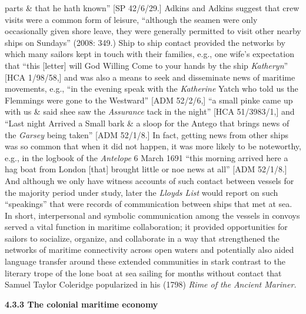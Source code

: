 \begin{styleStandard}
parts \& that he hath known” [SP 42/6/29.] Adkins and Adkins suggest that crew visits were a common form of leisure, “although the seamen were only occasionally given shore leave, they were generally permitted to visit other nearby ships on Sundays” (2008: 349.) Ship to ship contact provided the networks by which many sailors kept in touch with their families, e.g., one wife’s expectation that “this [letter] will God Willing Come to your hands by the ship\textit{ Katheryn}” [HCA 1/98/58,] and was also a means to seek and disseminate news of maritime movements, e.g., “in the evening speak with the \textit{Katherine }Yatch who told us the Flemmings were gone to the Westward” [ADM 52/2/6,] “a small pinke came up with us \& said shee saw the \textit{Assurance} tack in the night” [HCA 51/3983/1,] and “Last night Arrived a Small bark \& a sloop for the Antego that brings news of the \textit{Garsey }being taken” [ADM 52/1/8.] In fact, getting news from other ships was so common that when it did\textit{ }not happen, it was more likely to be noteworthy, e.g., in the logbook of the\textit{ Antelope} 6 March 1691 “this morning arrived here a hag boat from London [that] brought little or noe news at all” [ADM 52/1/8.] And although we only have witness accounts of such contact between vessels for the majority period under study, later the \textit{Lloyd{\textquotesingle}s List} would report on such “speakings” that were records of communication between ships that met at sea. In short, interpersonal and symbolic communication among the vessels in convoys served a vital function in maritime collaboration; it provided opportunities for sailors to socialize, organize, and collaborate in a way that strengthened the networks of maritime connectivity across open waters and potentially also aided language transfer around these extended communities in stark contrast to the literary trope of the lone boat at sea sailing for months without contact that Samuel Taylor Coleridge popularized in his (1798) \textit{Rime of the }\textit{\MakeUppercase{A}}\textit{ncient Mariner. }
\end{styleStandard}


\begin{styleStandard}
\textbf{4.3.3 The colonial maritime economy}
\end{styleStandard}


